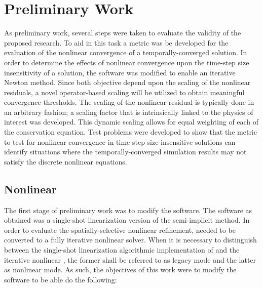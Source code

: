 \chapter{Preliminary Work}
\label{chap:prelim_work}
As preliminary work, several steps were taken to evaluate the validity of the proposed research.
To aid in this task a metric was be developed for the evaluation of the nonlinear convergence of a temporally-converged solution.
In order to determine the effects of nonlinear convergence upon the time-step size insensitivity of a solution, the \cobra{} software was modified to enable an iterative Newton method.
Since both objective depend upon the scaling of the nonlinear residuals, a novel operator-based scaling will be utilized to obtain meaningful convergence thresholds.
The scaling of the nonlinear residual is typically done in an arbitrary fashion; a scaling factor that is intrinsically linked to the physics of interest was developed.
This dynamic scaling allows for equal weighting of each of the conservation equation. 
Test problems were developed to show that the metric to test for nonlinear convergence in time-step size insensitive solutions can identify situations where the temporally-converged simulation results may not satisfy the discrete nonlinear equations.
\section{Nonlinear \cobra{}}
\label{sect:nl_cobra}
The first stage of preliminary work was to modify the \cobra{} software.
The \cobra{} software as obtained was a single-shot linearization version of the semi-implicit method.
In order to evaluate the spatially-selective nonlinear refinement, \cobra{} needed to be converted to a fully iterative nonlinear solver.
When it is necessary to distinguish between the single-shot linearization algorithmic implementation of \cobra{} and the iterative nonlinear \cobra{}, the former shall be referred to as legacy mode and the latter as nonlinear mode.
As such, the objectives of this work were to modify the software to be able do the following:

